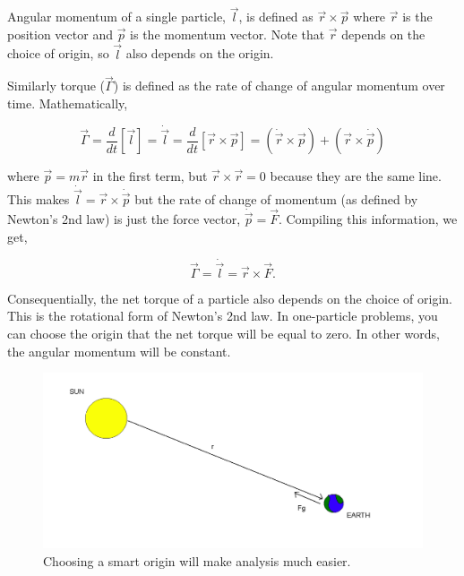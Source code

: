 Angular momentum of a single particle, $\vec{l}$, is defined as $\vec{r} \times \vec{p}$ where $\vec{r}$ is the position vector and $\vec{p}$ is the momentum vector. Note that $\vec{r}$ depends on the choice of origin, so $\vec{l}$ also depends on the origin.

Similarly torque ($\vec{\Gamma}$) is defined as the rate of change of angular momentum over time. Mathematically, 

\begin{equation*}
    \vec{\Gamma} = \frac{d}{dt}[\vec{l}] = \dot{\vec{l}} = \frac{d}{dt}[\vec{r} \times \vec{p}] = (\dot{\vec{r}} \times \vec{p}) + (\vec{r} \times \dot{\vec{p}})
\end{equation*}

\noindent where $\vec{p} = m \vec{r}$ in the first term, but $\vec{r} \times \vec{r} = 0$ because they are the same line. This makes $\dot{\vec{l}} = \vec{r} \times \dot{\vec{p}}$ but the rate of change of momentum (as defined by Newton's 2nd law) is just the force vector, $\dot{\vec{p}} = \vec{F}$. Compiling this information, we get,

\begin{equation*}
    \vec{\Gamma} = \dot{\vec{l}} = \vec{r} \times \vec{F}.
\end{equation*}

Consequentially, the net torque of a particle also depends on the choice of origin. This is the rotational form of Newton's 2nd law. In one-particle problems, you can choose the origin that the net torque will be equal to zero. In other words, the angular momentum will be constant.

\begin{figure}[h]
    \centering
    \includegraphics[width=13cm]{Classical_Mechanics/2.6-angular-momentum/torque-earthsun-sys.png}
    \caption{Choosing a smart origin will make analysis much easier.}
    \label{fig:torque-earthsun-sys}
\end{figure}

